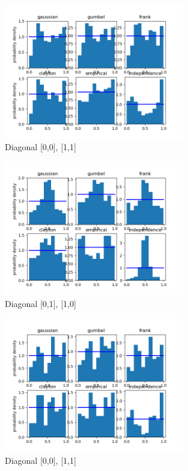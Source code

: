 

\begin{figure}[h]
	\centering
	\includegraphics[width=0.7\textwidth]{RTS/Area_1/2020-05-16_13_00-2020-05-16_14_00-0.png}
	\caption{Diagonal [0,0], [1,1]}
\end{figure}

\begin{figure}[h]
	\centering
	\includegraphics[width=0.7\textwidth]{RTS/Area_1/2020-05-16_13_00-2020-05-16_14_00-1.png}
	\caption{Diagonal [0,1], [1,0]}
\end{figure}

\clearpage



\begin{figure}[h]
	\centering
	\includegraphics[width=0.7\textwidth]{RTS/Area_1/2020-08-27_18_00-2020-08-27_19_00-0.png}
	\caption{Diagonal [0,0], [1,1]}
\end{figure}

